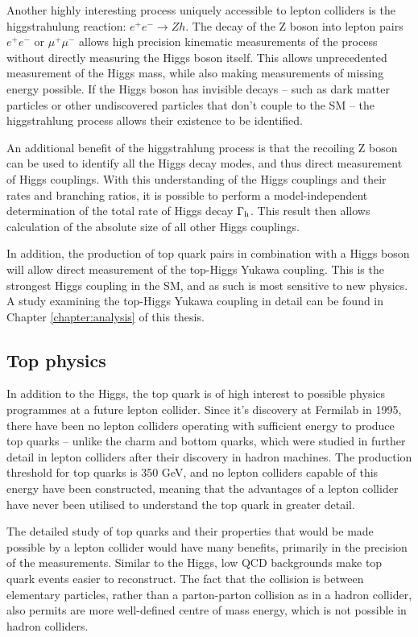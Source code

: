 Another highly interesting process uniquely accessible to lepton colliders is the higgstrahulung reaction: $e^+ e^- \rightarrow Zh$. The decay of the Z boson into lepton pairs $e^+ e^-$ or $\mu^+ \mu^-$ allows high precision kinematic measurements of the process without directly measuring the Higgs boson itself. This allows unprecedented measurement of the Higgs mass, while also making measurements of missing energy possible. If the Higgs boson has invisible decays -- such as dark matter particles or other undiscovered particles that don't couple to the \acrshort{SM} -- the higgstrahlung process allows their existence to be identified.

An additional benefit of the higgstrahlung process is that the recoiling Z boson can be used to identify all the Higgs decay modes, and thus direct measurement of Higgs couplings. With this understanding of the Higgs couplings and their rates and branching ratios, it is possible to perform a model-independent determination of the total rate of Higgs decay $\Gamma\textsubscript{h}$. This result then allows calculation of the absolute size of all other Higgs couplings.

In addition, the production of top quark pairs in combination with a Higgs boson will allow direct measurement of the top-Higgs Yukawa coupling. This is the strongest Higgs coupling in the \acrshort{SM}, and as such is most sensitive to new physics. A study examining the top-Higgs Yukawa coupling in detail can be found in Chapter \ref{chapter:analysis} of this thesis.

\subsection{Top physics}
In addition to the Higgs, the top quark is of high interest to possible physics programmes at a future lepton collider. Since it's discovery at Fermilab in 1995, there have been no lepton colliders operating with sufficient energy to produce top quarks -- unlike the charm and bottom quarks, which were studied in further detail in lepton colliders after their discovery in hadron machines. The production threshold for top quarks is 350 GeV, and no lepton colliders capable of this energy have been constructed, meaning that the advantages of a lepton collider have never been utilised to understand the top quark in greater detail. 

The detailed study of top quarks and their properties that would be made possible by a lepton collider would have many benefits, primarily in the precision of the measurements. Similar to the Higgs, low \acrshort{QCD} backgrounds make top quark events easier to reconstruct. The fact that the collision is between elementary particles, rather than a parton-parton collision as in a hadron collider, also permits are more well-defined centre of mass energy, which is not possible in hadron colliders.

